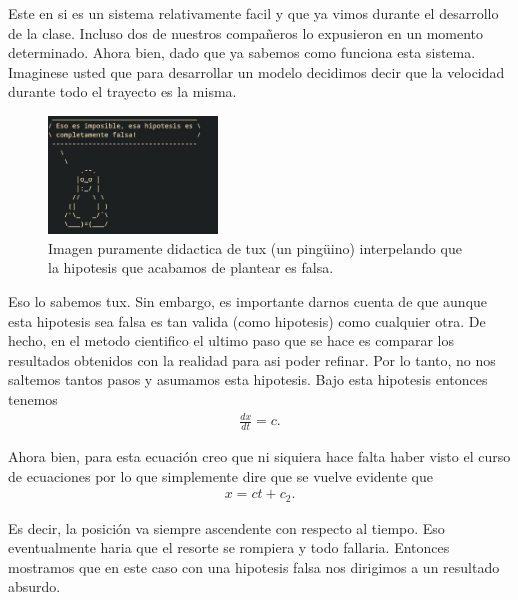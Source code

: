 \documentclass{report}
\begin{document}
Este en si es un sistema relativamente facil y que ya vimos durante el desarrollo de la clase. Incluso dos de nuestros compañeros lo expusieron en un momento determinado. Ahora bien, dado que ya sabemos como funciona esta sistema. Imaginese usted que para desarrollar un modelo decidimos decir que la velocidad durante todo el trayecto es la misma.

\begin{figure}[htpb]
  \centering
  \includegraphics[width=0.4\textwidth]{image/cowsay/tux1.jpeg}
  \caption{Imagen puramente didactica de tux (un pingüino) interpelando que la hipotesis que acabamos de plantear es falsa.}
  \label{fig:image-cowsay-tux1-jpeg}
\end{figure}

Eso lo sabemos tux. Sin embargo, es importante darnos cuenta de que aunque esta hipotesis sea falsa es tan valida (como hipotesis) como cualquier otra. De hecho, en el metodo cientifico el ultimo paso que se hace es comparar los resultados obtenidos con la realidad para asi poder refinar. Por lo tanto, no nos saltemos tantos pasos y asumamos esta hipotesis. Bajo esta hipotesis entonces tenemos
\begin{align*}
  \frac{d x}{dt} = c
.\end{align*}

Ahora bien, para esta ecuación creo que ni siquiera hace falta haber visto el curso de ecuaciones por lo que simplemente dire que se vuelve evidente que 
\begin{align*}
  x = ct + c_2
.\end{align*}

Es decir, la posición va siempre ascendente con respecto al tiempo. Eso eventualmente haria que el resorte se rompiera y todo fallaria. Entonces mostramos que en este caso con una hipotesis falsa nos dirigimos a un resultado absurdo.
\end{document}
